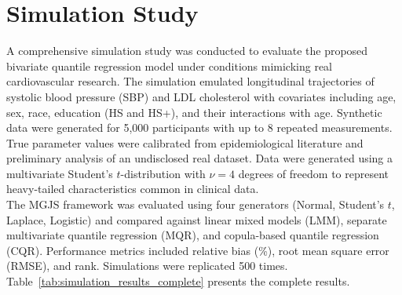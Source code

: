 \documentclass[twoside]{article}
\begin{document}
\section{Simulation Study}\label{sec5}

A comprehensive simulation study was conducted to evaluate the proposed bivariate quantile regression model under conditions mimicking real cardiovascular research. The simulation emulated longitudinal trajectories of systolic blood pressure (SBP) and LDL cholesterol with covariates including age, sex, race, education (HS and HS+), and their interactions with age. Synthetic data were generated for 5,000 participants with up to 8 repeated measurements. True parameter values were calibrated from epidemiological literature and preliminary analysis of an undisclosed real dataset. Data were generated using a multivariate Student's $t$-distribution with $\nu = 4$ degrees of freedom to represent heavy-tailed characteristics common in clinical data.\\
The MGJS framework was evaluated using four generators (Normal, Student's $t$, Laplace, Logistic) and compared against linear mixed models (LMM), separate multivariate quantile regression (MQR), and copula-based quantile regression (CQR). Performance metrics included relative bias (\%), root mean square error (RMSE), and rank. Simulations were replicated 500 times. Table~\ref{tab:simulation_results_complete} presents the complete results.
\end{document}

